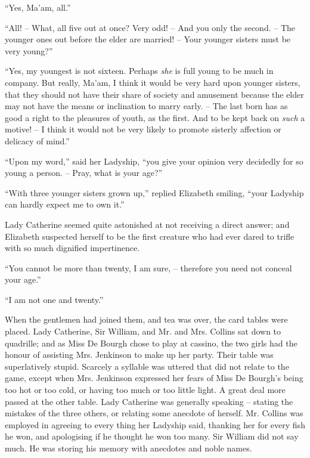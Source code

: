 “Yes, Ma’am, all.”

“All! -- What, all five out at once? Very odd! -- And
you only the second. -- The younger ones out before the
elder are married! -- Your younger sisters must be very
young?”

“Yes, my youngest is not sixteen. Perhaps \textit{she} is full
young to be much in company. But really, Ma’am,
I think it would be very hard upon younger sisters, that
they should not have their share of society and amusement
because the elder may not have the means or inclination
to marry early. -- The last born has as good a right to the
pleasures of youth, as the first. And to be kept back on
\textit{such} a motive! -- I think it would not be very likely to
promote sisterly affection or delicacy of mind.”

“Upon my word,” said her Ladyship, “you give your
opinion very decidedly for so young a person. -- Pray, what
is your age?”

“With three younger sisters grown up,” replied Elizabeth
smiling, “your Ladyship can hardly expect me to own
it.”

Lady Catherine seemed quite astonished at not receiving
a direct answer; and Elizabeth suspected herself to be
the first creature who had ever dared to trifle with so
much dignified impertinence.

“You cannot be more than twenty, I am sure, -- therefore
you need not conceal your age.”

“I am not one and twenty.”

When the gentlemen had joined them, and tea was over,
the card tables were placed. Lady Catherine, Sir William,
and Mr. and Mrs. Collins sat down to quadrille; and as
Miss De Bourgh chose to play at cassino, the two girls
had the honour of assisting Mrs. Jenkinson to make up
her party. Their table was superlatively stupid. Scarcely
a syllable was uttered that did not relate to the game,
except when Mrs. Jenkinson expressed her fears of Miss
De Bourgh’s being too hot or too cold, or having too much
or too little light. A great deal more passed at the other
table. Lady Catherine was generally speaking -- stating
the mistakes of the three others, or relating some anecdote
of herself. Mr. Collins was employed in agreeing to
every thing her Ladyship said, thanking her for every
fish he won, and apologising if he thought he won too
many. Sir William did not say much. He was storing
his memory with anecdotes and noble names.

